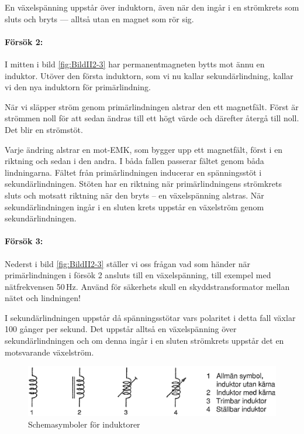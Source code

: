 En växelspänning uppstår över induktorn, även när den ingår i en strömkrets som
sluts och bryts --- alltså utan en magnet som rör sig.

\noindent\paragraph{Försök 2:} 

I mitten i bild \ref{fig:BildII2-3} har permanentmagneten bytts mot ännu en
induktor. Utöver den första induktorn, som vi nu kallar sekundärlindning, kallar
vi den nya induktorn för primärlindning.

När vi släpper ström genom primärlindningen alstrar den ett magnetfält. Först är
strömmen noll för att sedan ändras till ett högt värde och därefter återgå till
noll. Det blir en strömstöt.

Varje ändring alstrar en mot-EMK, som bygger upp ett magnetfält, först i en
riktning och sedan i den andra. I båda fallen passerar fältet genom båda
lindningarna. Fältet från primärlindningen inducerar en spänningsstöt i
sekundärlindningen. Stöten har en riktning när primärlindningens strömkrets
sluts och motsatt riktning när den bryts -- en växelspänning alstras. När
sekundärlindningen ingår i en sluten krets uppstår en växelström genom
sekundärlindningen.

\noindent\paragraph{Försök 3:}

Nederst i bild \ref{fig:BildII2-3} ställer vi oss frågan vad som händer när
primärlindningen i försök 2 ansluts till en växelspänning, till exempel med
nätfrekvensen 50\,Hz. Använd för säkerhets skull en skyddstransformator mellan
nätet och lindningen!

I sekundärlindningen uppstår då spänningsstötar vars polaritet i detta
fall växlar 100 gånger per sekund. Det uppstår alltså en växelspänning
över sekundärlindningen och om denna ingår i en sluten strömkrets
uppstår det en motsvarande växelström.

\begin{figure}
\includegraphics[width=\textwidth]{images/cropped_pdfs/bild_2_2-04.pdf}
\caption{Schemasymboler för induktorer}
\label{fig:BildII2-4}
\end{figure}


